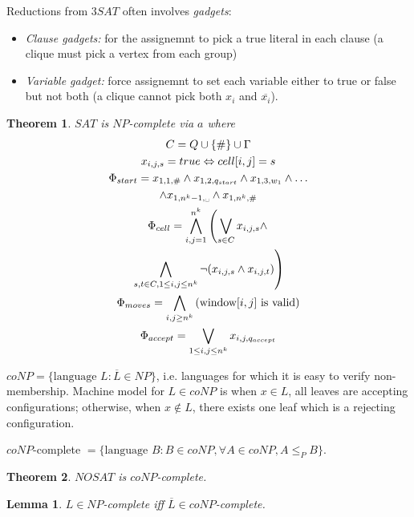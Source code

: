 \documentclass[letterpaper,landscape,11pt]{article}
\newtheorem{theorem}{Theorem}
\newtheorem{lemma}{Lemma}
\begin{document}
Reductions from $3SAT$ often involves \emph{gadgets}:
\begin{itemize}
	\item \emph{Clause gadgets:} for the assignemnt to pick a true literal in each clause (a clique must pick a vertex from each group)
	\item \emph{Variable gadget:} force assignemnt to set each variable either to true or false but not both (a clique cannot pick both $x_i$ and $\overline{x_i}$).
\end{itemize}

\begin{theorem}
	$SAT$ is $NP$-complete via $a$ where
	\begin{gather*}
		C = Q \cup \{\#\} \cup \Gamma \\
		x_{i, j, s} = true \Leftrightarrow cell[i, j] = s \\
		\Phi_{start} = x_{1, 1, \#} \land x_{1, 2, q_{start}} \land x_{1, 3, w_1} \land \dots \\
		\land x_{1, n^k-1, \text{\textvisiblespace}} \land x_{1, n^k, \#} \\
		\Phi_{cell} = \bigwedge\limits_{i, j = 1}^{n^k} \left(\bigvee\limits_{s \in C} x_{i, j, s} \land \right. \\
		\left. \bigwedge\limits_{s, t \in C, 1 \leq i, j \leq n^k} \lnot (x_{i, j, s} \land x_{i, j, t})\right) \\
		\Phi_{moves} = \bigwedge\limits_{i, j \geq n^k} \text{(window}[i, j] \text{ is valid)} \\
		\Phi_{accept} = \bigvee\limits_{1 \leq i, j \leq n^k} x_{i, j, q_{accept}}
	\end{gather*}
\end{theorem}

$coNP = \{\text{language } L : \overline{L} \in NP\}$, i.e. languages for which it is easy to verify non-membership. Machine model for $L \in coNP$ is when $x \in L$, all leaves are accepting configurations; otherwise, when $x \notin L$, there exists one leaf which is a rejecting configuration.

$coNP$-complete $ = \{\text{language } B : B \in coNP, \forall A \in coNP, A \leq_P B\}$.

\begin{theorem}
	$NOSAT$ is $coNP$-complete.
\end{theorem}

\begin{lemma}
	$L \in NP$-complete iff $\overline{L} \in coNP$-complete.
\end{lemma}
\end{document}
